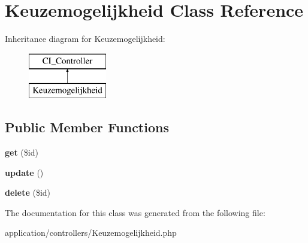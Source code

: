 \hypertarget{class_keuzemogelijkheid}{}\section{Keuzemogelijkheid Class Reference}
\label{class_keuzemogelijkheid}
Inheritance diagram for Keuzemogelijkheid\+:\begin{figure}[H]
\begin{center}
\leavevmode
\includegraphics[height=2.000000cm]{class_keuzemogelijkheid}
\end{center}
\end{figure}
\subsection*{Public Member Functions}
\begin{DoxyCompactItemize}
\item 
\mbox{\label{class_keuzemogelijkheid_a50e3bfb586b2f42932a6a93f3fbb0828}} 
{\bfseries get} (\$id)
\item 
\mbox{\label{class_keuzemogelijkheid_a842e4774e3b3601a005b995c02f7e883}} 
{\bfseries update} ()
\item 
\mbox{\label{class_keuzemogelijkheid_a2f8258add505482d7f00ea26493a5723}} 
{\bfseries delete} (\$id)
\end{DoxyCompactItemize}


The documentation for this class was generated from the following file\+:\begin{DoxyCompactItemize}
\item 
application/controllers/Keuzemogelijkheid.\+php\end{DoxyCompactItemize}
